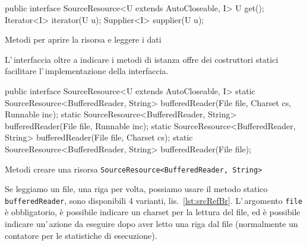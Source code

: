 \begin{elisting}[!htb]
\begin{javacode}
public interface SourceResource<U extends AutoCloseable, I> {
    U get();
    Iterator<I> iterator(U u);
    Supplier<I> supplier(U u);
}
\end{javacode}
\caption{Metodi per aprire la risorsa e leggere i dati}
\label{lst:srcRef}
\end{elisting}

L'\,interfaccia oltre a indicare i metodi di istanza offre dei costruttori
statici facilitare l'\,implementazione della interfaccia.

\begin{elisting}[!htb]
\begin{javacode}
public interface SourceResource<U extends AutoCloseable, I> {
    static SourceResource<BufferedReader, String> bufferedReader(File file, Charset cs, Runnable inc);
    static SourceResource<BufferedReader, String> bufferedReader(File file, Runnable inc);
    static SourceResource<BufferedReader, String> bufferedReader(File file, Charset cs);
    static SourceResource<BufferedReader, String> bufferedReader(File file);
}
\end{javacode}
\caption{Metodi creare una risorsa \texttt{SourceResource<BufferedReader, String>}}
\label{lst:srcRefBr}
\end{elisting}
Se leggiamo un file, una riga per volta, possiamo usare il metodo statico
\texttt{bufferedReader}, sono disponibili 4 varianti, lis.~\ref{lst:srcRefBr}.
L'\,argomento \texttt{file} è obbligatorio, è possibile indicare un charset per
la lettura del file, ed è possibile indicare un'\,azione da eseguire dopo aver
letto una riga dal file (normalmente un contatore per le statistiche di
esecuzione).

